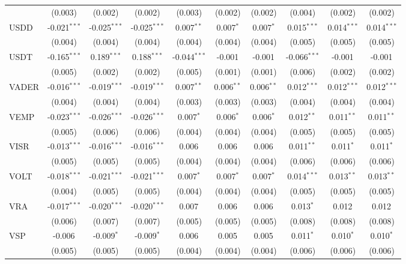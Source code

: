 \begin{table}[!htbp]
\begin{tabular}{@{\extracolsep{5pt}}lccccccccc}
  & (0.003) & (0.002) & (0.002) & (0.003) & (0.002) & (0.002) & (0.004) & (0.002) & (0.002) \\
 USDD & -0.021$^{***}$ & -0.025$^{***}$ & -0.025$^{***}$ & 0.007$^{**}$ & 0.007$^{*}$ & 0.007$^{*}$ & 0.015$^{***}$ & 0.014$^{***}$ & 0.014$^{***}$ \\
  & (0.004) & (0.004) & (0.004) & (0.004) & (0.004) & (0.004) & (0.005) & (0.005) & (0.005) \\
 USDT & -0.165$^{***}$ & 0.189$^{***}$ & 0.188$^{***}$ & -0.044$^{***}$ & -0.001$^{}$ & -0.001$^{}$ & -0.066$^{***}$ & -0.001$^{}$ & -0.001$^{}$ \\
  & (0.005) & (0.002) & (0.002) & (0.005) & (0.001) & (0.001) & (0.006) & (0.002) & (0.002) \\
 VADER & -0.016$^{***}$ & -0.019$^{***}$ & -0.019$^{***}$ & 0.007$^{**}$ & 0.006$^{**}$ & 0.006$^{**}$ & 0.012$^{***}$ & 0.012$^{***}$ & 0.012$^{***}$ \\
  & (0.004) & (0.004) & (0.004) & (0.003) & (0.003) & (0.003) & (0.004) & (0.004) & (0.004) \\
 VEMP & -0.023$^{***}$ & -0.026$^{***}$ & -0.026$^{***}$ & 0.007$^{*}$ & 0.006$^{*}$ & 0.006$^{*}$ & 0.012$^{**}$ & 0.011$^{**}$ & 0.011$^{**}$ \\
  & (0.005) & (0.006) & (0.006) & (0.004) & (0.004) & (0.004) & (0.005) & (0.005) & (0.005) \\
 VISR & -0.013$^{***}$ & -0.016$^{***}$ & -0.016$^{***}$ & 0.006$^{}$ & 0.006$^{}$ & 0.006$^{}$ & 0.011$^{**}$ & 0.011$^{*}$ & 0.011$^{*}$ \\
  & (0.005) & (0.005) & (0.005) & (0.004) & (0.004) & (0.004) & (0.006) & (0.006) & (0.006) \\
 VOLT & -0.018$^{***}$ & -0.021$^{***}$ & -0.021$^{***}$ & 0.007$^{*}$ & 0.007$^{*}$ & 0.007$^{*}$ & 0.014$^{***}$ & 0.013$^{**}$ & 0.013$^{**}$ \\
  & (0.004) & (0.005) & (0.005) & (0.004) & (0.004) & (0.004) & (0.005) & (0.005) & (0.005) \\
 VRA & -0.017$^{***}$ & -0.020$^{***}$ & -0.020$^{***}$ & 0.007$^{}$ & 0.006$^{}$ & 0.006$^{}$ & 0.013$^{*}$ & 0.012$^{}$ & 0.012$^{}$ \\
  & (0.006) & (0.007) & (0.007) & (0.005) & (0.005) & (0.005) & (0.008) & (0.008) & (0.008) \\
 VSP & -0.006$^{}$ & -0.009$^{*}$ & -0.009$^{*}$ & 0.006$^{}$ & 0.005$^{}$ & 0.005$^{}$ & 0.011$^{*}$ & 0.010$^{*}$ & 0.010$^{*}$ \\
  & (0.005) & (0.005) & (0.005) & (0.004) & (0.004) & (0.004) & (0.006) & (0.006) & (0.006) \\

\end{tabular}
\end{table}
